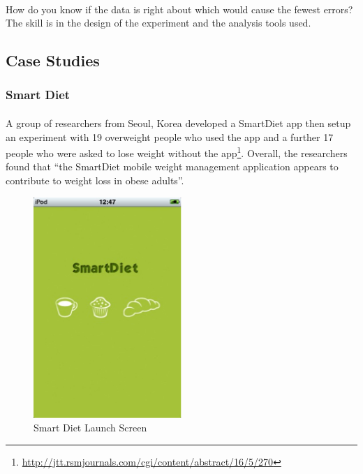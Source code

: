 \documentclass[12pt, a4paper, twoside]{book}
\begin{document}
\paragraph{} How do you know if the data is right about which would cause the fewest errors?  The skill is in the design of the experiment and the analysis tools used.

\subsection{Case Studies}
\subsubsection{Smart Diet}

\paragraph{} A group of researchers from Seoul, Korea developed a SmartDiet app then setup an experiment with 19 overweight people who used the app and a further 17 people who were asked to lose weight without the app\footnote{\url{http://jtt.rsmjournals.com/cgi/content/abstract/16/5/270}}. Overall, the researchers found that ``the SmartDiet mobile weight management application appears to contribute to weight loss in obese adults''.

\begin{figure}[H]
\centering
\includegraphics[width=0.5\textwidth]{images/smart-diet-1}
\caption{Smart Diet Launch Screen}
\label{fig:smart-diet-1}
\end{figure}
\end{document}
